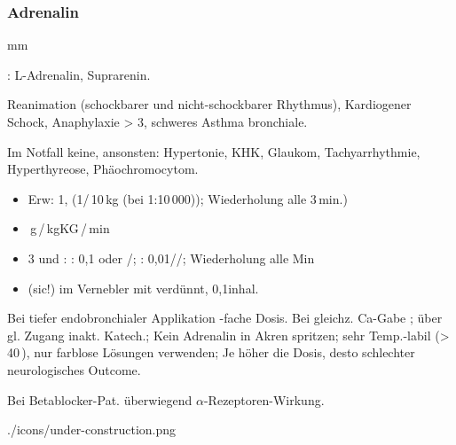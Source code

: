 \subsubsection{Adrenalin}

{
\begin{labeling}[:]{mm}
  \item[Präp] : L-Adrenalin,  Suprarenin.
  \item[Ind] Reanimation (schockbarer und nicht-schockbarer Rhythmus),
  Kardiogener Schock, Anaphylaxie > 3{\textdegree},  schweres Asthma bronchiale.
  \item[KI]Im Notfall keine, ansonsten:
  Hypertonie, KHK, Glaukom, Tachyarrhythmie, Hyperthyreose,
  Phäochromocytom.
  \item[\textrecipe]
  \begin{itemize}
    \item {} Erw: 1\Mg, 
    (1\Ml*/\,10\,kg (bei 1:10\,000)); Wiederholung alle 3\,min.)
    \item {}
    \,{\textmu}g\,/\,kgKG\,/\,min
    \item {} 3{\textdegree} und : 
    : 0,1\Mg* {} oder \Mg* {}/; 
    : 0,01\MgKg//; 
    Wiederholung alle  Min
    \item {}  (sic!) im Vernebler  mit 
    verdünnt, 0,1\MgKg* inhal.
  \end{itemize}
  \item[Anm] Bei tiefer endobronchialer Applikation -fache Dosis.
  Bei gleichz. Ca-Gabe ;  über gl. Zugang inakt.
  Katech.; Kein Adrenalin in Akren spritzen; sehr Temp.-labil
  ({\textgreater}\,40\,{\textcelsius}), nur farblose Lösungen verwenden; Je höher die
  Dosis, desto schlechter neurologisches Outcome.
  \item[Cave] Bei Betablocker-Pat. überwiegend
  {$\alpha$}-Rezeptoren-Wirkung.
\end{labeling}
}
{}
{./icons/under-construction.png}
{}
{}









